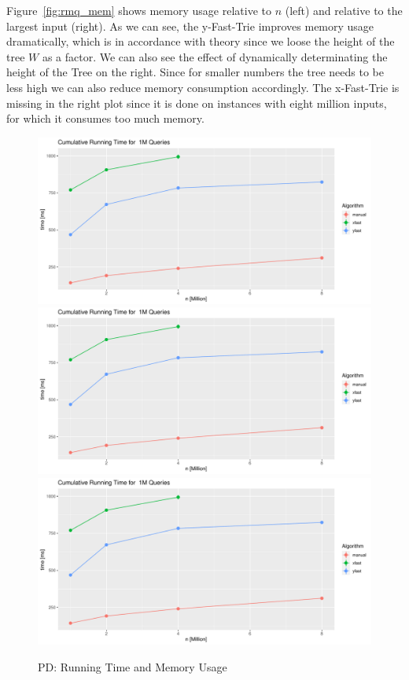 \documentclass[a4paper,UKenglish,cleveref, autoref, thm-restate]{lipics-v2021}
\begin{document}
Figure~\ref{fig:rmq_mem} shows memory usage relative to $n$ (left) and relative to the largest input 
(right). As we can see, the y-Fast-Trie improves memory usage dramatically, which is in accordance with 
theory since we loose the height of the tree $W$ as a factor. We can also see the effect of dynamically 
determinating the height of the Tree on the right. Since for smaller numbers the tree needs to be less high 
we can also reduce memory consumption accordingly. The x-Fast-Trie is missing in the right plot since it is 
done on instances with eight million inputs, for which it consumes too much memory.

\begin{figure}[!htb]
 \centering
\includegraphics[page=9, width=0.9\linewidth]{../../eval/plots.pdf}
 \endminipage\hfill
 \centering
\includegraphics[page=10, width=0.9\linewidth]{../../eval/plots.pdf}
 \endminipage
 \linebreak
 \centering
\includegraphics[page=13, width=0.9\linewidth]{../../eval/plots.pdf}
 \endminipage
   \caption{PD: Running Time and Memory Usage}
      \label{fig:pd}
\end{figure}
\end{document}
